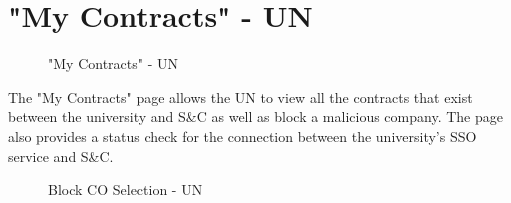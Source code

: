 \section{"My Contracts" - UN}
\label{subsec:my-contracts-un}%

\begin{figure}[H]
    \centering
    \caption{"My Contracts" - UN}
    \label{fig:my-contracts-un}
\end{figure}

\par The "My Contracts" page allows the UN to view all the contracts that exist between the university and S\&C as well
as block a malicious company. The page also provides a status check for the connection between the university's SSO
service and S\&C.

\begin{figure}[H]
    \centering
    \caption{Block CO Selection - UN}
    \label{fig:block-co-selection-un}
\end{figure}


